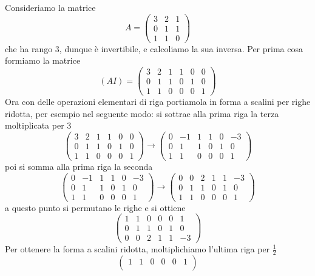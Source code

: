 \begin{example}
	Consideriamo la matrice
	\[
		A = \begin{pmatrix}
			3 & 2 & 1 \\
			0 & 1 & 1 \\
			1 & 1 & 0
		\end{pmatrix}
	\]
	che ha rango 3, dunque è invertibile, e calcoliamo la
	sua inversa. Per prima cosa formiamo la matrice
	\[
		(A I) = \begin{pmatrix}
			3 & 2 & 1 & 1 & 0 & 0 \\
			0 & 1 & 1 & 0 & 1 & 0 \\
			1 & 1 & 0 & 0 & 0 & 1
		\end{pmatrix}
	\]
	Ora con delle operazioni elementari di riga portiamola in forma a scalini
	per righe ridotta, per esempio nel seguente modo: si sottrae alla prima riga
	la terza moltiplicata per 3
	\[
		\begin{pmatrix}
			3 & 2 & 1 & 1 & 0 & 0 \\
			0 & 1 & 1 & 0 & 1 & 0 \\
			1 & 1 & 0 & 0 & 0 & 1
		\end{pmatrix} \to
		\begin{pmatrix}
			0 & -1 & 1 & 1 & 0 & -3 \\
			0 & 1  & 1 & 0 & 1 & 0  \\
			1 & 1  & 0 & 0 & 0 & 1
		\end{pmatrix}
	\]
	poi si somma alla prima riga la seconda
	\[
		\begin{pmatrix}
			0 & -1 & 1 & 1 & 0 & -3 \\
			0 & 1  & 1 & 0 & 1 & 0  \\
			1 & 1  & 0 & 0 & 0 & 1
		\end{pmatrix} \to
		\begin{pmatrix}
			0 & 0 & 2 & 1 & 1 & -3 \\
			0 & 1 & 1 & 0 & 1 & 0  \\
			1 & 1 & 0 & 0 & 0 & 1
		\end{pmatrix}
	\]
	a questo punto si permutano le righe e si ottiene
	\[
		\begin{pmatrix}
			1 & 1 & 0 & 0 & 0 & 1  \\
			0 & 1 & 1 & 0 & 1 & 0  \\
			0 & 0 & 2 & 1 & 1 & -3
		\end{pmatrix}
	\]
	Per ottenere la forma a scalini ridotta, moltiplichiamo l'ultima riga per
	$\frac{1}{2}$
	\[
		\begin{pmatrix}
			1 & 1 & 0 & 0           & 0           & 1            \\

\end{pmatrix}\]
\end{example}
